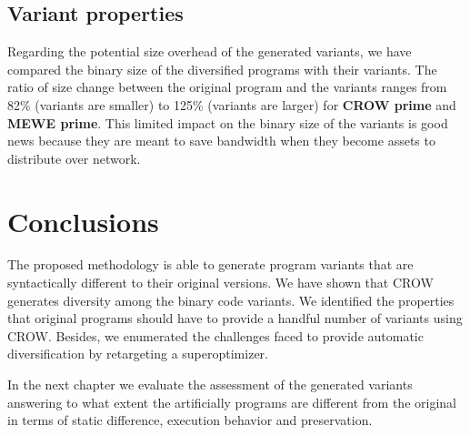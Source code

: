 \subsection{Variant properties}

Regarding the potential size overhead of the generated variants, we have compared the \wasm binary size of the diversified programs with their variants. The ratio of size change between the original program and the variants ranges from 82\% (variants are smaller) to 125\% (variants are larger) for \textbf{CROW prime} and \textbf{MEWE prime}. This limited impact on the binary size of the variants is good news because they are meant to save bandwidth when they become assets to distribute over network.

\pagebreak
\section{Conclusions}

The proposed methodology is able to generate program variants that are syntactically different to their original versions. We have shown that CROW generates diversity among the binary code variants. We identified the properties that original programs should have to provide a handful number of variants using CROW. Besides, we enumerated the challenges faced to provide automatic diversification by retargeting a superoptimizer.

In the next chapter we evaluate the assessment of the generated variants answering to what extent the artificially programs are different from the original in terms of static difference, execution behavior and preservation.

\let\cleardoublepage\clearpage